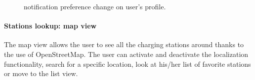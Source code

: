 \begin{figure}[h!]
    \centering
    \begin{minipage}{0.49\textwidth}
        \centering
    \end{minipage}
    \caption{notification preference change on user's profile.}
\end{figure}

\pagebreak

\paragraph{Stations lookup: map view} The map view allows the user to see all the charging stations around thanks to the use of OpenStreetMap. The user can activate and deactivate the localization functionality, search for a specific location, look at his/her list of favorite stations or move to the list view.

